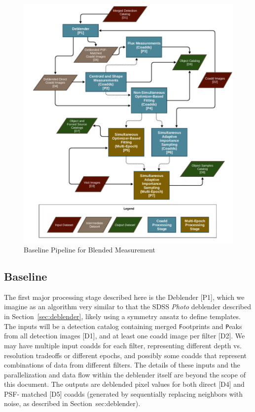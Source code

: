 \documentclass[10pt]{article}
\begin{document}
\begin{figure}
\includegraphics[width=\columnwidth]{flowchart}
\caption{Baseline Pipeline for Blended Measurement}
\label{fig:flowchart}
\end{figure}

\subsection{Baseline}

The first major processing stage described here is the Deblender [P1], which
we imagine as an algorithm very similar to that the SDSS {\em Photo} deblender
described in Section~\ref{sec:deblender}, likely using a symmetry ansatz to
define templates.  The inputs will be a detection catalog containing merged
{\texttt Footprints} and {\texttt Peaks} from all detection images [D1], and
at least one coadd image per filter [D2].  We may have multiple input coadds
for each filter, representing different depth vs. resolution tradeoffs or
different epochs, and possibly some coadds that represent combinations of data
from different filters. The details of these inputs and the parallelization
and data flow within the deblender itself are beyond the scope of this
document. The outputs are deblended pixel values for both direct [D4] and PSF-
matched [D5] coadds (generated by sequentially replacing neighbors with noise,
as described in Section~{sec:deblender}).
\end{document}
